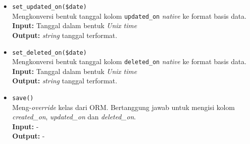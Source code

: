 \begin{itemize}
\begin{itemize}
                \item \texttt{set\_updated\_on(\$date)} \\
                    Mengkonversi bentuk tanggal kolom \texttt{updated\_on} \textit{native} ke 
                    format basis data. \\
                    \textbf{Input:} Tanggal dalam bentuk \textit{Unix time}\\
                    \textbf{Output:} \textit{string} tanggal terformat.
                    
                \item \texttt{set\_deleted\_on(\$date)} \\
                    Mengkonversi bentuk tanggal kolom \texttt{deleted\_on} \textit{native} ke 
                    format basis data. \\
                    \textbf{Input:} Tanggal dalam bentuk \textit{Unix time}\\
                    \textbf{Output:} \textit{string} tanggal terformat.
                    
                \item \texttt{save()}\\
                    Meng-\textit{override} kelas dari ORM. Bertanggung jawab untuk mengisi
                    kolom \textit{created\_on}, \textit{updated\_on} dan \textit{deleted\_on}.\\
                    \textbf{Input:} -\\
                    \textbf{Output:} -
            \end{itemize}
            

\end{itemize}
